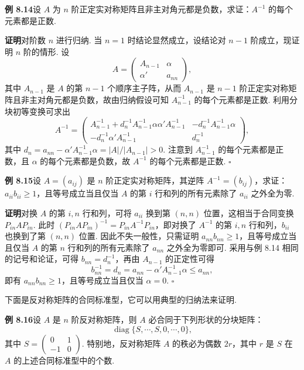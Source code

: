 \documentclass[UTF8,12pt,a4paper,fontset=fandol]{ctexart}
\begin{document}
\noindent\textbf{例 8.14}\quad 设 $A$ 为 $n$ 阶正定实对称矩阵且非主对角元都是负数，求证：$A^{-1}$ 的每个元素都是正数.

\noindent\textbf{证明}\quad 对阶数 $n$ 进行归纳. 当 $n=1$ 时结论显然成立，设结论对 $n-1$ 阶成立，现证明 $n$ 阶的情形. 设
\[
A=\left(\begin{array}{cc}
A_{n-1} & \alpha\\
\alpha' & a_{nn}
\end{array}\right),
\]
其中 $A_{n-1}$ 是 $A$ 的第 $n-1$ 个顺序主子阵，从而 $A_{n-1}$ 是 $n-1$ 阶正定实对称矩阵且非主对角元都是负数，故由归纳假设可知 $A_{n-1}^{-1}$ 的每个元素都是正数. 利用分块初等变换可求出
\[
A^{-1}=\left(\begin{array}{cc}
A_{n-1}^{-1}+d_n^{-1}A_{n-1}^{-1}\alpha\alpha'A_{n-1}^{-1} &
-d_n^{-1}A_{n-1}^{-1}\alpha\\
-d_n^{-1}\alpha'A_{n-1}^{-1} & d_n^{-1}
\end{array}\right),
\]
其中 $d_n=a_{nn}-\alpha'A_{n-1}^{-1}\alpha=|A|/|A_{n-1}|>0$. 注意到 $A_{n-1}^{-1}$ 的每个元素都是正数，且 $\alpha$ 的每个元素都是负数，故 $A^{-1}$ 的每个元素都是正数. $\ensuremath{\square}$

\noindent\textbf{例 8.15}\quad 设 $A=(a_{ij})$ 是 $n$ 阶正定实对称矩阵，其逆阵 $A^{-1}=(b_{ij})$，求证：$a_{ii}b_{ii}\ge 1$，且等号成立当且仅当 $A$ 的第 $i$ 行和列的所有元素除了 $a_{ii}$ 之外全为零.

\noindent\textbf{证明}\quad 对换 $A$ 的第 $i,n$ 行和列，可将 $a_{ii}$ 换到第 $(n,n)$ 位置，这相当于合同变换 $P_{in}AP_{in}$. 此时 $(P_{in}AP_{in})^{-1}=P_{in}A^{-1}P_{in}$，即对换了 $A^{-1}$ 的第 $i,n$ 行和列，$b_{ii}$ 也换到了第 $(n,n)$ 位置. 因此不失一般性，只需证明 $a_{nn}b_{nn}\ge 1$，且等号成立当且仅当 $A$ 的第 $n$ 行和列的所有元素除了 $a_{nn}$ 之外全为零即可. 采用与例 8.14 相同的记号和论证，可得 $b_{nn}=d_n^{-1}$，再由 $A_{n-1}$ 的正定性可得
\[
b_{nn}^{-1}=d_n=a_{nn}-\alpha'A_{n-1}^{-1}\alpha\le a_{nn},
\]
即有 $a_{nn}b_{nn}\ge 1$，且等号成立当且仅当 $\alpha=0$. $\ensuremath{\square}$

下面是反对称矩阵的合同标准型，它可以用典型的归纳法来证明.

\noindent\textbf{例 8.16}\quad 设 $A$ 是 $n$ 阶反对称矩阵，则 $A$ 必合同于下列形状的分块矩阵：
\begin{equation}
\operatorname{diag}\{S,\cdots,S,0,\cdots,0\},
\tag{8.2}
\end{equation}
其中 $S=\left(\begin{array}{cc}0&1\\ -1&0\end{array}\right)$. 特别地，反对称矩阵 $A$ 的秩必为偶数 $2r$，其中 $r$ 是 $S$ 在 $A$ 的上述合同标准型中的个数.
\end{document}
